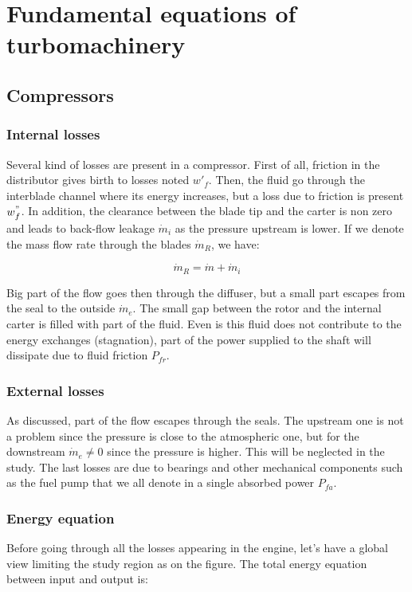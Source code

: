 \section{Fundamental equations of turbomachinery}
\subsection{Compressors}
\subsubsection{Internal losses}
Several kind of losses are present in a compressor. First of all, friction in the distributor gives birth to losses noted $w'_f$. Then, the fluid go through the interblade channel where its energy increases, but a loss due to friction is present $w^"_f$. In addition, the clearance between the blade tip and the carter is non zero and leads to back-flow leakage $\dot{m}_i$ as the pressure upstream is lower. If we denote the mass flow rate through the blades $\dot{m}_R$, we have: 

\begin{equation}
\dot{m}_R = \dot{m} + \dot{m}_i
\end{equation}

Big part of the flow goes then through the diffuser, but a small part escapes from the seal to the outside $\dot{m}_e$. The small gap between the rotor and the internal carter is filled with part of the fluid. Even is this fluid does not contribute to the energy exchanges (stagnation), part of the power supplied to the shaft will dissipate due to fluid friction $P_{fr}$. 

\subsubsection{External losses}
As discussed, part of the flow escapes through the seals. The upstream one is not a problem since the pressure is close to the atmospheric one, but for the downstream $\dot{m}_e \neq 0$ since the pressure is higher. This will be neglected in the study. The last losses are due to bearings and other mechanical components such as the fuel pump that we all denote in a single absorbed power $P_{fa}$. 

\subsubsection{Energy equation}
Before going through all the losses appearing in the engine, let's have a global view limiting the study region as on the figure. The total energy equation between input and output is: 

